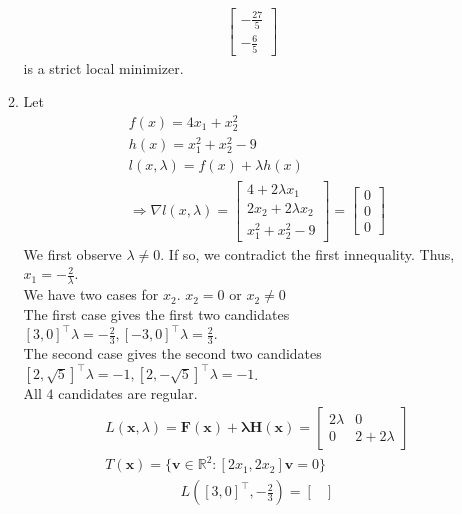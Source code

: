 \documentclass[10pt]{article}
\begin{document}
\begin{enumerate}
\begin{enumerate}
\begin{align*}
\begin{bmatrix}
                -\frac{27}{5}\\
                -\frac{6}{5}
            \end{bmatrix}  
        \end{align*} is a strict local minimizer.
        \item Let \begin{align*}
            &f(x)=4x_1+x_2^2\\
            &h(x)=x_1^2+x_2^2-9\\
            &l(x,\lambda)=f(x)+\lambda h(x)\\
            &\Rightarrow \nabla l(x,\lambda)=\begin{bmatrix}
                4+2\lambda x_1\\
                2x_2+2\lambda x_2\\
                x_1^2+x_2^2-9 
            \end{bmatrix}=\begin{bmatrix}
                0\\
                0\\
                0
            \end{bmatrix}
        \end{align*}
        We first observe $\lambda\neq 0$. If so, we contradict the first innequality. Thus, $x_1=-\frac{2}{\lambda}$.\\
        We have two cases for $x_2$. $x_2=0$ or $x_2\neq 0$\\
        The first case gives the first two candidates ${[3,0]}^\top\lambda=-\frac{2}{3},{[-3,0]}^\top\lambda=\frac{2}{3}$.\\
        The second case gives the second two candidates ${[2,\sqrt{5}]}^\top\lambda=-1,{[2,-\sqrt{5}]}^\top\lambda=-1$.\\
        All $4$ candidates are regular.\\
        \begin{align*}
            &L(\mathbf{x},\lambda)=\mathbf{F}(\mathbf{x})+\mathbf{\lambda}\mathbf{H}(\mathbf{x})=\begin{bmatrix}
                2\lambda & 0\\
                0 & 2+2\lambda
            \end{bmatrix}\\
            &T(\mathbf{x})=\{\mathbf{v}\in\mathbb{R}^2:[2x_1,2x_2]\mathbf{v}=0\}
        \end{align*}
        \begin{align*}
            &L({[3,0]}^\top,-\frac{2}{3})=\begin{bmatrix}

\end{bmatrix}
\end{align*}
\end{enumerate}
\end{enumerate}
\end{document}
